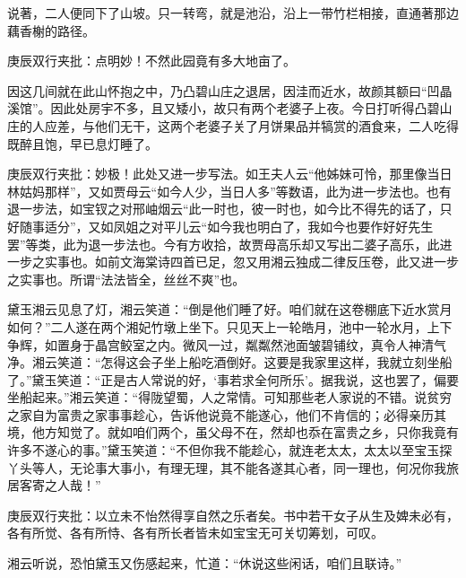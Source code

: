 \begin{parag}


    说著，二人便同下了山坡。只一转弯，就是池沿，沿上一带竹栏相接，直通著那边藕香榭的路径。\begin{note}庚辰双行夹批：点明妙！不然此园竟有多大地亩了。\end{note}因这几间就在此山怀抱之中，乃凸碧山庄之退居，因洼而近水，故颜其额曰“凹晶溪馆”。因此处房宇不多，且又矮小，故只有两个老婆子上夜。今日打听得凸碧山庄的人应差，与他们无干，这两个老婆子关了月饼果品并犒赏的酒食来，二人吃得既醉且饱，早已息灯睡了。\begin{note}庚辰双行夹批：妙极！此处又进一步写法。如王夫人云“他姊妹可怜，那里像当日林姑妈那样”，又如贾母云“如今人少，当日人多”等数语，此为进一步法也。也有退一步法，如宝钗之对邢岫烟云“此一时也，彼一时也，如今比不得先的话了，只好随事适分”，又如凤姐之对平儿云“如今我也明白了，我如今也要作好好先生罢”等类，此为退一步法也。今有方收拾，故贾母高乐却又写出二婆子高乐，此进一步之实事也。如前文海棠诗四首已足，忽又用湘云独成二律反压卷，此又进一步之实事也。所谓“法法皆全，丝丝不爽”也。\end{note}
\end{parag}


\begin{parag}


    黛玉湘云见息了灯，湘云笑道：“倒是他们睡了好。咱们就在这卷棚底下近水赏月如何？”二人遂在两个湘妃竹墩上坐下。只见天上一轮皓月，池中一轮水月，上下争辉，如置身于晶宫鲛室之内。微风一过，粼粼然池面皱碧铺纹，真令人神清气净。湘云笑道：“怎得这会子坐上船吃酒倒好。这要是我家里这样，我就立刻坐船了。”黛玉笑道：“正是古人常说的好，‘事若求全何所乐’。据我说，这也罢了，偏要坐船起来。”湘云笑道：“得陇望蜀，人之常情。可知那些老人家说的不错。说贫穷之家自为富贵之家事事趁心，告诉他说竟不能遂心，他们不肯信的；必得亲历其境，他方知觉了。就如咱们两个，虽父母不在，然却也忝在富贵之乡，只你我竟有许多不遂心的事。”黛玉笑道：“不但你我不能趁心，就连老太太，太太以至宝玉探丫头等人，无论事大事小，有理无理，其不能各遂其心者，同一理也，何况你我旅居客寄之人哉！”\begin{note}庚辰双行夹批：以立未不怡然得享自然之乐者矣。书中若干女子从生及婢未必有，各有所觉、各有所恃、各有所长者皆未如宝宝无可关切筹划，可叹。\end{note}湘云听说，恐怕黛玉又伤感起来，忙道：“休说这些闲话，咱们且联诗。”
\end{parag}


